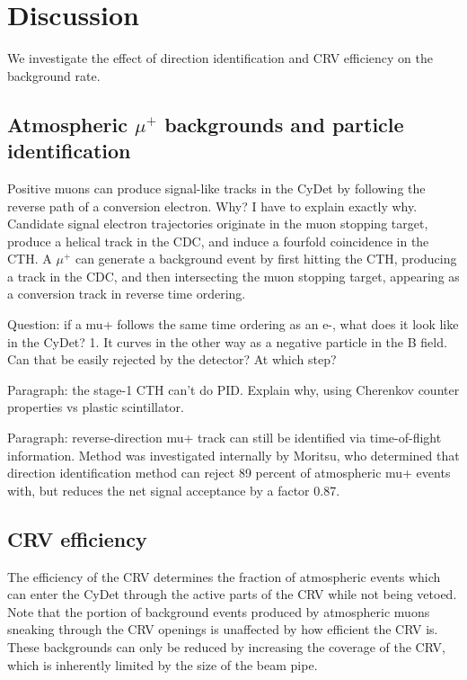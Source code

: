 \section{Discussion}

We investigate the effect of direction identification and CRV efficiency on the
background rate.

\subsection{Atmospheric $\mu^+$ backgrounds and particle identification}
Positive muons can produce signal-like tracks in the CyDet by following the
reverse path of a conversion electron. Why? I have to explain exactly why.
Candidate signal electron trajectories originate in the muon stopping target,
produce a helical track in the CDC, and induce a fourfold coincidence in the
CTH. A $\mu^+$ can generate a background event by first hitting the CTH,
producing a track in the CDC, and then intersecting the muon stopping target,
appearing as a conversion track in reverse time ordering.

Question: if a mu+ follows the same time ordering as an e-, what does it look
like in the CyDet? 1. It curves in the other way as a negative particle in the B
field. Can that be easily rejected by the detector? At which step?

Paragraph: the stage-1 CTH can't do PID. Explain why, using Cherenkov counter
properties vs plastic scintillator.

Paragraph: reverse-direction mu+ track can still be identified via
time-of-flight information. Method was investigated internally by Moritsu, who
determined that direction identification method can reject 89 percent of
atmospheric mu+ events with, but reduces the net signal acceptance by a
factor 0.87.


\subsection{CRV efficiency}
The efficiency of the CRV determines the fraction of atmospheric events which
can enter the CyDet through the active parts of the CRV while not being vetoed.
Note that the portion of background events produced by atmospheric muons
sneaking through the CRV openings is unaffected by how efficient the CRV is.
These backgrounds can only be reduced by increasing the coverage of the CRV,
which is inherently limited by the size of the beam pipe.



